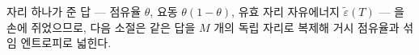 자리 하나가 준 답 --- 점유율 $\theta$, 요동 $\theta(1-\theta)$, 유효 자리 자유에너지
$\tilde\varepsilon(T)$ --- 을 손에 쥐었으므로, 다음 소절은 같은 답을 $M$ 개의 독립 자리로 복제해 거시
점유율과 섞임 엔트로피로 넓힌다.

